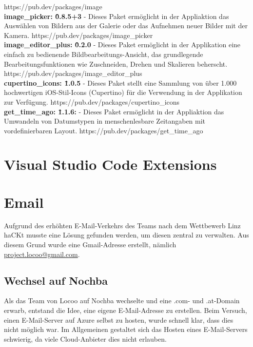 https://pub.dev/packages/image
\\
\textbf{image\_picker: \^0.8.5+3}\cite{package_image_picker} - Dieses Paket ermöglicht in der Appliaktion das Auswählen von Bildern aus der Galerie oder das Aufnehmen neuer Bilder mit der Kamera.
https://pub.dev/packages/image\_picker
\\
\textbf{image\_editor\_plus: \^0.2.0}\cite{package_image_editor_plus} - Dieses Paket ermöglicht in der Applikation eine einfach zu bedienende Bildbearbeitungs-Ansicht, das grundlegende Bearbeitungsfunktionen wie Zuschneiden, Drehen und Skalieren beherscht.
https://pub.dev/packages/image\_editor\_plus
\\
\textbf{cupertino\_icons: \^1.0.5}\cite{package_cupertino_icons} - Dieses Paket stellt eine Sammlung von über 1.000 hochwertigen iOS-Stil-Icons (Cupertino) für die Verwendung in der Applikation zur Verfügung.
https://pub.dev/packages/cupertino\_icons
\\
\textbf{get\_time\_ago: \^1.1.6:}\cite{package_get_time_ago} - Dieses Paket ermöglicht in der Appliaktion das Umwandeln von Datumstypen in menschenlesbare Zeitangaben mit vordefinierbaren Layout.
https://pub.dev/packages/get\_time\_ago


\section{Visual Studio Code Extensions}




\section{Email}
Aufgrund des erhöhten E-Mail-Verkehrs des Teams nach dem Wettbewerb Linz haCKt musste eine Lösung gefunden werden, um diesen zentral zu verwalten. Aus diesem Grund wurde eine Gmail-Adresse erstellt, nämlich \href{mailto:project.locoo@gmail.com}{project.locoo@gmail.com}.

\subsection{Wechsel auf Nochba}
Als das Team von Locoo auf Nochba wechselte und eine .com- und .at-Domain erwarb, entstand die Idee, eine eigene E-Mail-Adresse zu erstellen. Beim Versuch, einen E-Mail-Server auf Azure selbst zu hosten, wurde schnell klar, dass dies nicht möglich war. Im Allgemeinen gestaltet sich das Hosten eines E-Mail-Servers schwierig, da viele Cloud-Anbieter dies nicht erlauben.

